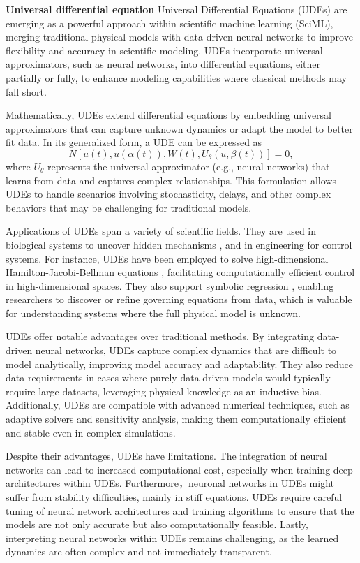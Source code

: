 \textbf{Universal differential equation} 
Universal Differential Equations (UDEs) are emerging as a powerful approach within scientific machine learning (SciML), merging traditional physical models with data-driven neural networks to improve flexibility and accuracy in scientific modeling. UDEs incorporate universal approximators, such as neural networks, into differential equations, either partially or fully, to enhance modeling capabilities where classical methods may fall short.

Mathematically, UDEs extend differential equations by embedding universal approximators that can capture unknown dynamics or adapt the model to better fit data. In its generalized form, a UDE can be expressed as 
\[
N[u(t), u(\alpha(t)), W(t), U_{\theta}(u, \beta(t))] = 0,
\]
where \(U_{\theta}\) represents the universal approximator (e.g., neural networks) that learns from data and captures complex relationships. This formulation allows UDEs to handle scenarios involving stochasticity, delays, and other complex behaviors that may be challenging for traditional models.

Applications of UDEs span a variety of scientific fields. They are used in biological systems to uncover hidden mechanisms \cite{rackauckas2020universal}, and in engineering for control systems. For instance, UDEs have been employed to solve high-dimensional Hamilton-Jacobi-Bellman equations \cite{rackauckas2020universal}, facilitating computationally efficient control in high-dimensional spaces. They also support symbolic regression \cite{rackauckas2020universal}, enabling researchers to discover or refine governing equations from data, which is valuable for understanding systems where the full physical model is unknown.

UDEs offer notable advantages over traditional methods. By integrating data-driven neural networks, UDEs capture complex dynamics that are difficult to model analytically, improving model accuracy and adaptability. They also reduce data requirements in cases where purely data-driven models would typically require large datasets, leveraging physical knowledge as an inductive bias. Additionally, UDEs are compatible with advanced numerical techniques, such as adaptive solvers and sensitivity analysis, making them computationally efficient and stable even in complex simulations.

Despite their advantages, UDEs have limitations. The integration of neural networks can lead to increased computational cost, especially when training deep architectures within UDEs. Furthermore，neuronal networks in UDEs might suffer from stability difficulties, mainly in stiff equations. UDEs require careful tuning of neural network architectures and training algorithms to ensure that the models are not only accurate but also computationally feasible. Lastly, interpreting neural networks within UDEs remains challenging, as the learned dynamics are often complex and not immediately transparent.

